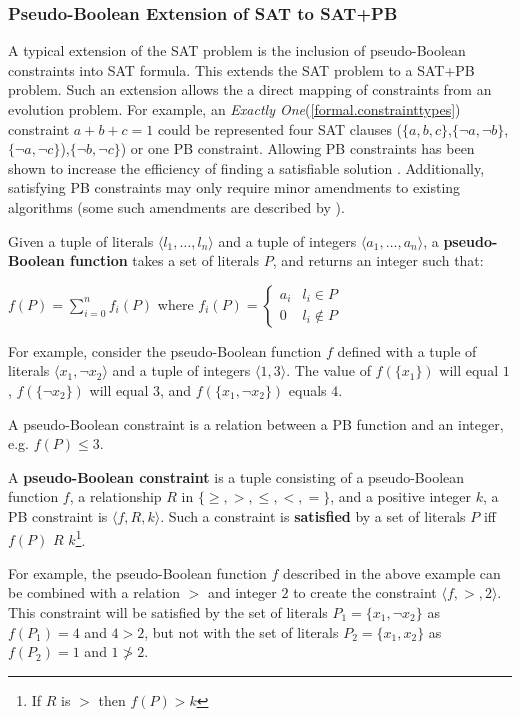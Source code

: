\subsubsection{Pseudo-Boolean Extension of SAT to SAT+PB}
A typical extension of the SAT problem is the inclusion of pseudo-Boolean constraints \citep{dixon2004automating} into SAT formula.
This extends the SAT problem to a SAT+PB problem.
Such an extension allows the a direct mapping of constraints from an evolution problem.
For example, an \textit{Exactly One}(\ref{formal.constrainttypes}) constraint $a + b + c = 1$ could  be represented four SAT clauses 
($\{a,b,c\}$,$\{\neg a, \neg b\}$,$\{\neg a,\neg c\}$),$\{\neg b,\neg c\}$) or one PB constraint.
Allowing PB constraints has been shown to increase the efficiency of finding a satisfiable solution \citep{dixon2004automating}.
Additionally, satisfying PB constraints may only require minor amendments to existing algorithms (some such amendments are described by \cite{Sheini2006}).

\begin{defs}
\label{impl.PBfunction}
Given a tuple of literals $\langle l_1,\ldots,l_n \rangle$ and a tuple of integers $\langle a_1,\ldots,a_n\rangle$,
a \textbf{pseudo-Boolean function} takes a set of literals $P$, and returns an integer such that:

$f(P) = \sum \limits_{i=0}^n f_i(P)$
where $f_i(P) = \begin{cases} a_i & l_i \in P \\ 0 & l_i \not \in P \end{cases}$
\end{defs}
For example, consider the pseudo-Boolean function $f$ defined with a tuple of literals $\langle x_1, \neg x_2\rangle$ and a tuple of integers $\langle 1,3\rangle$.
The value of $f(\{x_1\})$ will equal $1$, $f(\{\neg x_2\})$ will equal $3$, and $f(\{x_1,\neg x_2\})$ equals $4$.

A pseudo-Boolean constraint is a relation between a PB function and an integer, e.g. $f(P) \leq 3$.
\begin{defs}
\label{impl.PBConstraint}
A \textbf{pseudo-Boolean constraint} is a tuple consisting of a pseudo-Boolean function $f$, a relationship  $R$ in $\{\geq,>,\leq,<,=\}$, and a positive integer $k$, 
a PB constraint is $\langle f,R,k\rangle$.
Such a constraint is \textbf{satisfied} by a set of literals $P$ iff $ f(P)$ $R$ $k$\footnote{If $R$ is $>$ then $f(P) > k$}.
\end{defs}
For example, the pseudo-Boolean function $f$ described in the above example can be combined with a relation $>$ and integer $2$ to create the constraint $\langle f, >, 2 \rangle$.  
This constraint will be satisfied by the set of literals $P_1 = \{ x_1, \neg x_2 \}$ as $f(P_1) = 4$ and $4 > 2$, 
but not with the set of literals $P_2 = \{ x_1,  x_2 \}$ as $f(P_2) = 1$  and $ 1 \not > 2$.

